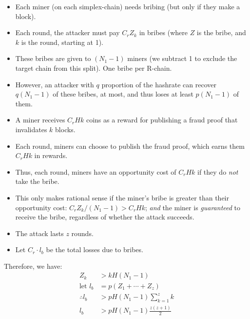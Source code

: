 \begin{itemize}
    \item Each miner (on each simplex-chain) needs bribing (but only if they make a block).
    \item Each round, the attacker must pay $C_r Z_k$ in bribes (where $Z$ is the bribe, and $k$ is the round, starting at 1).
    \item These bribes are given to $(N_1 - 1)$ miners (we subtract 1 to exclude the target chain from this split). One bribe per R-chain.
    \item However, an attacker with $q$ proportion of the hashrate can recover $q(N_1 - 1)$ of these bribes, at most, and thus loses at least $p(N_1 - 1)$ of them.
    \item A miner receives $C_r H k$ coins as a reward for publishing a fraud proof that invalidates $k$ blocks.
    \item Each round, miners can choose to publish the fraud proof, which earns them $C_r H k$ in rewards.
    \item Thus, each round, miners have an opportunity cost of $C_r H k$ if they do \emph{not} take the bribe.
    \item This only makes rational sense if the miner's bribe is greater than their opportunity cost: $C_r Z_k / (N_1 - 1) > C_r H k$; \emph{and} the miner is \emph{guaranteed} to receive the bribe, regardless of whether the attack succeeds.
    \item The attack lasts $z$ rounds.
    \item Let $C_r \cdot l_b$ be the total losses due to bribes.
\end{itemize}

Therefore, we have:
\begin{align}
    Z_k &> k H (N_1-1) \nonumber \\
    \text{let } l_b &= p (Z_1 + \cdots + Z_z) \nonumber \\
    \therefore l_b &> p H (N_1-1) \sum\limits_{k=1}^z k \nonumber \\
    l_b &> p H (N_1-1) \frac{z (z+1)}{2}
        \label{eq:spv-atk-losses-bribes}
\end{align}

